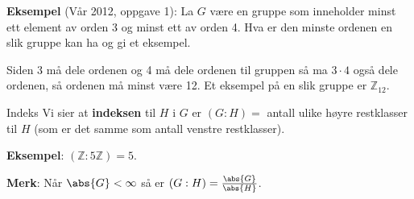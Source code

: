 \textbf{Eksempel} (Vår 2012, oppgave 1): 
La $G$ være en gruppe som inneholder minst ett element av orden 3 og minst ett av orden 4. Hva er
den minste ordenen en slik gruppe kan ha og gi et eksempel.

Siden 3 må dele ordenen og 4 må dele ordenen til gruppen så ma $3\cdot 4$ også dele ordenen,
så ordenen må minst være 12. Et eksempel på en slik gruppe er $\mathbb{Z}_{12}$.

\begin{definition}{Indeks}{}
  Vi sier at \textbf{indeksen} til $H$ i $G$ er $(G:H)=$ antall ulike høyre restklasser til $H$
  (som er det samme som antall venstre restklasser).
\end{definition}

\textbf{Eksempel}: $(\mathbb{Z}:5 \mathbb{Z})=5$.

\textbf{Merk}: Når $\abs{G}<\infty$ så er $(G:H)=\frac{\abs{G}}{\abs{H}}$.

